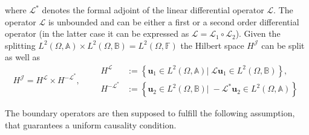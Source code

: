 \begin{assumption}
	where $\mathcal{L}^*$ denotes the formal adjoint of the linear differential operator $\mathcal{L}$. 	The operator $\mathcal{L}$ is unbounded and  can be either a first or a second order differential operator (in the latter case it can be expressed as $\mathcal{L} = \mathcal{L}_1 \circ \mathcal{L}_2$). Given the splitting $L^2(\Omega, \mathbb{A}) \times L^2(\Omega, \mathbb{B}) = L^2(\Omega, \mathbb{F})$ the Hilbert space $H^\mathcal{J}$ can be split as well as 
	\begin{equation}
		H^\mathcal{J} = H^\mathcal{L} \times H^\mathcal{-L^*}, \qquad
		\begin{aligned}
		H^\mathcal{L} &:= \left\{\bm{u}_1 \in L^2(\Omega, \mathbb{A}) \vert \; \mathcal{L}\bm{u}_1 \in L^2(\Omega, \mathbb{B}) \right\}, \\
		H^\mathcal{-L^*} &:= \left\{\bm{u}_2 \in L^2(\Omega, \mathbb{B}) \vert \; -\mathcal{L}^*\bm{u}_2 \in L^2(\Omega, \mathbb{A}) \right\}
		\end{aligned}
	\end{equation}
\end{assumption}

The boundary operators are then supposed to fulfill the following assumption, that guarantees a uniform causality condition.

